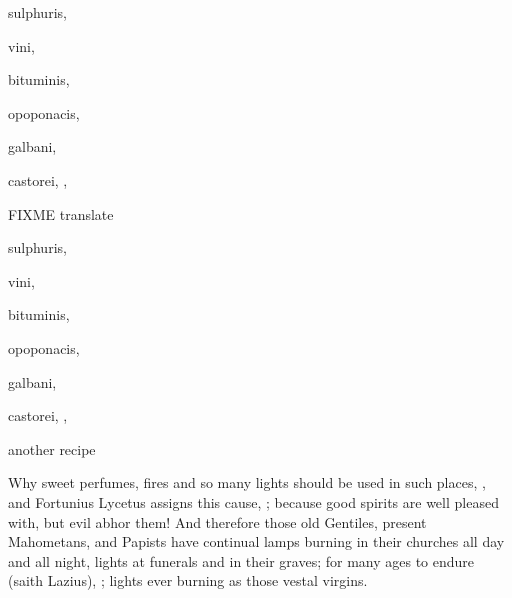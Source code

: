 {\begin{Prescription}[H]
\begin{prescriptionbox}{}{}
\item \textlatin{sulphuris},
\item \textlatin{vini},
\item \textlatin{bituminis},
\item \textlatin{opoponacis},
\item \textlatin{galbani},
\item \textlatin{castorei, \etc{}},
\end{prescriptionbox}
\begin{prescriptionbox}{FIXME translate}{}
\item \textlatin{sulphuris},
\item \textlatin{vini},
\item \textlatin{bituminis},
\item \textlatin{opoponacis},
\item \textlatin{galbani},
\item \textlatin{castorei, \etc{}},
\end{prescriptionbox}
\caption{another recipe}
\end{Prescription}

Why sweet perfumes, fires and so many lights
should be used in such places, , and Fortunius Lycetus assigns this cause, ; because good spirits are well pleased
with, but evil abhor them! And therefore those old Gentiles, present
Mahometans, and Papists have continual lamps burning in their churches
all day and all night, lights at funerals and in their graves;  for many ages to endure (saith Lazius), ; lights ever burning as those vestal virgins.

}
